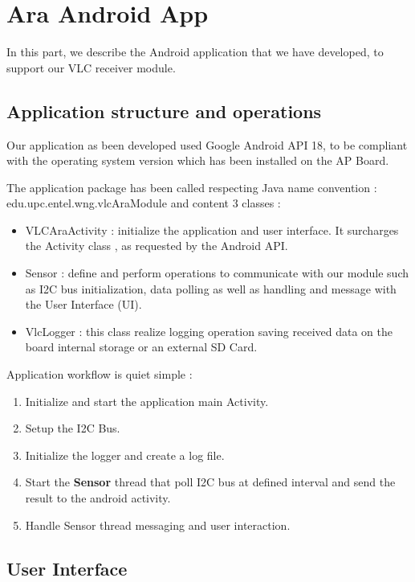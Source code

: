 \section{Ara Android App}

In this part, we describe the Android application that we have developed, to support our VLC receiver module.

\subsection{Application structure and operations}
Our application as been developed used Google Android API 18, to be compliant with the operating system version which has been installed on the AP Board.

The application package has been called respecting Java name convention : edu.upc.entel.wng.vlcAraModule and content 3 classes :

\begin{itemize}
\item VLCAraActivity : initialize the application and user interface. It surcharges the Activity class , as requested by the Android API.
\item Sensor : define and perform operations to communicate with our module such as I2C bus initialization, data polling as well as handling and message with the User Interface (UI).
\item VlcLogger : this class realize logging operation saving received data on the board internal storage or an external SD Card.
\end{itemize}

Application workflow is quiet simple :
\begin{enumerate}
\item Initialize and start the application main Activity.
\item Setup the I2C Bus.
\item Initialize the logger and create a log file.
\item Start the \textbf{Sensor} thread that poll I2C bus at defined interval and send the result to the android activity. 
\item Handle Sensor thread messaging and user interaction.
\end{enumerate}

\subsection{User Interface}

